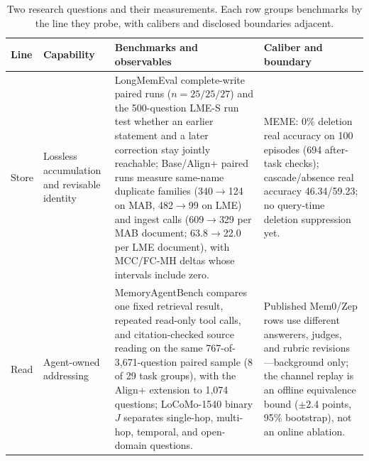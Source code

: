 \begin{table}[t]
\centering
\small
\setlength{\tabcolsep}{2.5pt}
\renewcommand{\arraystretch}{1.16}
\begin{tabular*}{\textwidth}{@{\extracolsep{\fill}}p{}p{}p{}p{}@{}}
\toprule
\textbf{Line} & \textbf{Capability} & \textbf{Benchmarks and observables} & \textbf{Caliber and boundary} \\
\midrule
Store & Lossless accumulation and revisable identity & LongMemEval complete-write paired runs ($n{=}25/25/27$) and the 500-question LME-S run test whether an earlier statement and a later correction stay jointly reachable; Base/Align+ paired runs measure same-name duplicate families (340$\to$124 on MAB, 482$\to$99 on LME) and ingest calls (609$\to$329 per MAB document; 63.8$\to$22.0 per LME document), with MCC/FC-MH deltas whose intervals include zero. & MEME: 0\% deletion real accuracy on 100 episodes (694 after-task checks); cascade/absence real accuracy 46.34/59.23; no query-time deletion suppression yet. \\
\midrule
Read & Agent-owned addressing & MemoryAgentBench compares one fixed retrieval result, repeated read-only tool calls, and citation-checked source reading on the same 767-of-3{,}671-question paired sample (8 of 29 task groups), with the Align+ extension to 1{,}074 questions; LoCoMo-1540 binary $J$ separates single-hop, multi-hop, temporal, and open-domain questions. & Published Mem0/Zep rows use different answerers, judges, and rubric revisions---background only; the channel replay is an offline equivalence bound ($\pm$2.4 points, 95\% bootstrap), not an online ablation. \\
\bottomrule
\end{tabular*}
\caption{Two research questions and their measurements. Each row groups benchmarks by the line they probe, with calibers and disclosed boundaries adjacent.}
\label{tab:experiment-map}
\end{table}
